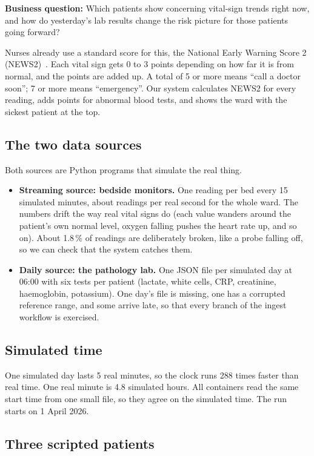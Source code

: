 \documentclass[11pt,a4paper]{article}
\begin{document}
\noindent\textbf{Business question:} Which patients show concerning vital-sign trends
right now, and how do yesterday's lab results change the risk picture for those
patients going forward?

Nurses already use a standard score for this, the National Early Warning Score 2
(NEWS2)~\cite{rcp}. Each vital sign gets 0 to 3 points depending on how far it is from
normal, and the points are added up. A total of 5 or more means ``call a doctor
soon''; 7 or more means ``emergency''. Our system calculates NEWS2 for every reading,
adds points for abnormal blood tests, and shows the ward with the sickest patient at
the top.

\subsection{The two data sources}

Both sources are Python programs that simulate the real thing.

\begin{itemize}
  \item \textbf{Streaming source: bedside monitors.} One reading per bed every 15
  simulated minutes, about \mThroughput{} readings per real second for the whole ward.
  The numbers drift the way real vital signs do (each value wanders around the
  patient's own normal level, oxygen falling pushes the heart rate up, and so on).
  About 1.8\,\% of readings are deliberately broken, like a probe falling off, so we can
  check that the system catches them.
  \item \textbf{Daily source: the pathology lab.} One JSON file per simulated day at
  06:00 with six tests per patient (lactate, white cells, CRP, creatinine, haemoglobin,
  potassium). One day's file is missing, one has a corrupted reference range, and some
  arrive late, so that every branch of the ingest workflow is exercised.
\end{itemize}

\subsection{Simulated time}

One simulated day lasts 5 real minutes, so the clock runs 288 times faster than real
time. One real minute is 4.8 simulated hours. All containers read the same start time
from one small file, so they agree on the simulated time. The run starts on 1 April 2026.

\subsection{Three scripted patients}
\end{document}
